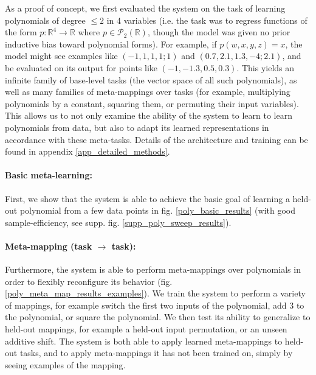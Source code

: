 \documentclass{article}
\begin{document}
As a proof of concept, we first evaluated the system on the task of learning polynomials of degree $\leq 2$ in 4 variables (i.e. the task was to regress functions of the form $p: \mathbb{R}^4 \rightarrow \mathbb{R}$ where $p \in \mathcal{P}_2 \left(\mathbb{R}\right)$, though the model was given no prior inductive bias toward polynomial forms). For example, if $p(w,x,y,z) = x$, the model might see examples like $(-1,1,1,1; 1)$ and $(0.7, 2.1, 1.3, -4; 2.1)$, and be evaluated on its output for points like $(-1, -1.3, 0.5, 0.3)$. This yields an infinite family of base-level tasks (the vector space of all such polynomials), as well as many families of meta-mappings over tasks (for example, multiplying polynomials by a constant, squaring them, or permuting their input variables). This allows us to not only examine the ability of the system to learn to learn polynomials from data, but also to adapt its learned representations in accordance with these meta-tasks. Details of the architecture and training can be found in appendix \ref{app_detailed_methods}.\par
\vspace{-0.7em}
\paragraph{Basic meta-learning:} First, we show that the system is able to achieve the basic goal of learning a held-out polynomial from a few data points in fig. \ref{poly_basic_results} (with good sample-efficiency, see supp. fig. \ref{supp_poly_sweep_results}). \par 
\vspace{-0.7em}
\paragraph{Meta-mapping (task $\rightarrow$ task):} Furthermore, the system is able to perform meta-mappings over polynomials in order to flexibly reconfigure its behavior (fig. \ref{poly_meta_map_results_examples}). We train the system to perform a variety of mappings, for example switch the first two inputs of the polynomial, add 3 to the polynomial, or square the polynomial. We then test its ability to generalize to held-out mappings, for example a held-out input permutation, or an unseen additive shift. The system is both able to apply learned meta-mappings to held-out tasks, and to apply meta-mappings it has not been trained on, simply by seeing examples of the mapping. \par 
\end{document}
